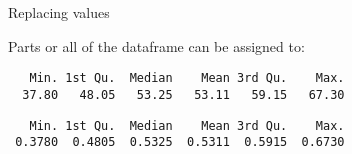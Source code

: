 \documentclass[8pt,ignorenonframetext,]{beamer}
\newenvironment{Shaded}{\begin{snugshade}}{\end{snugshade}}
\newcommand{\KeywordTok}[1]{\textcolor[rgb]{0.13,0.29,0.53}{\textbf{#1}}}
\newcommand{\DecValTok}[1]{\textcolor[rgb]{0.00,0.00,0.81}{#1}}
\newcommand{\StringTok}[1]{\textcolor[rgb]{0.31,0.60,0.02}{#1}}
\newcommand{\OperatorTok}[1]{\textcolor[rgb]{0.81,0.36,0.00}{\textbf{#1}}}
\newcommand{\NormalTok}[1]{#1}
\begin{document}
\begin{frame}[fragile]{Replacing values}

Parts or all of the dataframe can be assigned to:

\begin{Shaded}
\end{Shaded}

\begin{verbatim}
   Min. 1st Qu.  Median    Mean 3rd Qu.    Max. 
  37.80   48.05   53.25   53.11   59.15   67.30 
\end{verbatim}

\begin{Shaded}
\end{Shaded}

\begin{verbatim}
   Min. 1st Qu.  Median    Mean 3rd Qu.    Max. 
 0.3780  0.4805  0.5325  0.5311  0.5915  0.6730 
\end{verbatim}

\begin{Shaded}
\end{Shaded}

\end{frame}
\end{document}
